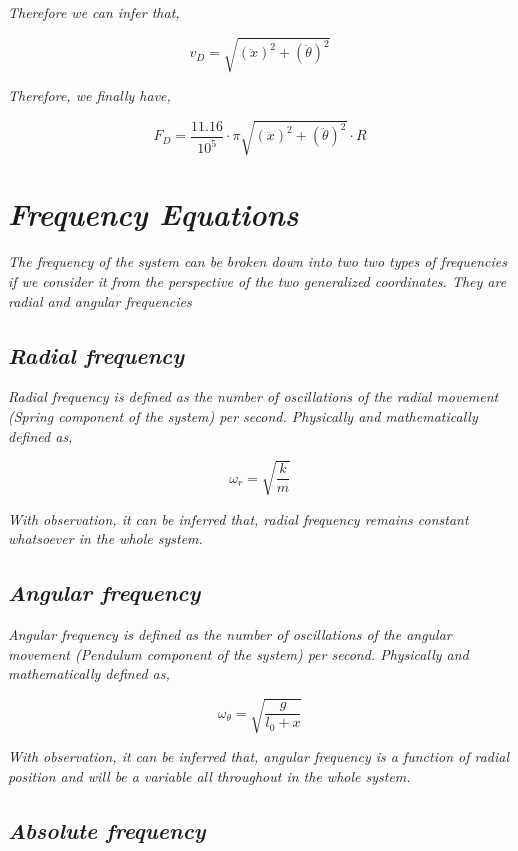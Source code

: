     \textit{Therefore we can infer that,}
        
        $$v_D = \sqrt{(\ddot{x})^2 + (\ddot{\theta})^2}$$
            
    \textit{Therefore, we finally have,}
            
        $$F_D = \frac{11.16}{10^{5}}\cdot\pi\sqrt{(\ddot{x})^2 + (\ddot{\theta})^2}\cdot R$$
            
\section{\textit{Frequency Equations}}
            
    \textit{The frequency of the system can be broken down into two two types of frequencies if we consider it from the perspective of the two generalized coordinates. They are radial and angular frequencies}
            
    \subsection{\textit{Radial frequency}}
                
        \textit{Radial frequency is defined as the number of oscillations of the radial movement (Spring component of the system) per second. Physically and mathematically defined as,}
                
            $$\omega_r = \sqrt{\frac{k}{m}}$$
                
        \textit{With observation, it can be inferred that, radial frequency remains constant whatsoever in the whole system.}
            
    \subsection{\textit{Angular frequency}}
                
        \textit{Angular frequency is defined as the number of oscillations of the angular movement (Pendulum component of the system) per second. Physically and mathematically defined as,}
                
            $$\omega_\theta = \sqrt{\frac{g}{l_0 + x}}$$
                
        \textit{With observation, it can be inferred that, angular frequency is a function of radial position and will be a variable all throughout in the whole system.}
                
    \subsection{\textit{Absolute frequency}}
                
